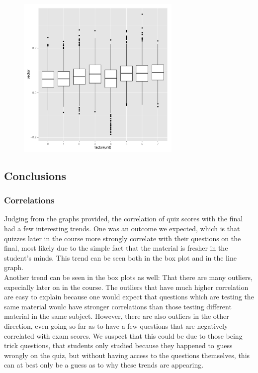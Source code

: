 \documentclass[12pt,a4paper]{article}
\begin{document}
\begin{singlespace}
\vspace{-0.5cm}
\begin{figure}[h!]
    \centering
    \includegraphics[width=0.7\textwidth,trim= 0 0 20 30, clip]{unrelatedcorrelationbox.pdf}
\end{figure}
\FloatBarrier

\subsection{Conclusions}
\subsubsection{Correlations}
Judging from the graphs provided, the correlation of quiz scores with the final had a few interesting trends. One was an outcome we expected, which is that quizzes later in the course more strongly correlate with their questions on the final, most likely due to the simple fact that the material is fresher in the student's minds. This trend can be seen both in the box plot and in the line graph. \\

Another trend can be seen in the box plots as well: That there are many outliers, expecially later on in the course. The outliers that have much higher correlation are easy to explain because one would expect that questions which are testing the same material woulc have stronger correlations than those testing different material in the same subject. However, there are also outliers in the other direction, even going so far as to have a few questions that are negatively correlated with exam scores. We suspect that this could be due to those being trick questions, that students only studied because they happened to guess wrongly on the quiz, but without having access to the questions themselves, this can at best only be a guess as to why these trends are appearing.

\end{singlespace}
\end{document}
